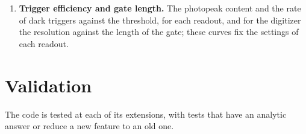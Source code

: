 \documentclass[11pt]{article}
\newcommand{\us}{\textmu s\xspace}
\newcommand{\csitl}{CsI(Tl)\xspace}
\begin{document}
\begin{enumerate}
  by the Citiroc or the Radioroc2, which store a fraction of them, are in
  the ratio computed in Section~\ref{sec:citiroc} from the pulse shape and
  the shaping time: 0.33 for BGO and 0.10 for \csitl with the Citiroc, 0.97
  for BGO and 0.71 for \csitl with the Radioroc2 at 1.8~\us, at room
  temperature. The ratio follows from the shaping chains alone, with no
  free parameter.
\item {\bf Trigger efficiency and gate length.} The photopeak content and
  the rate of dark triggers against the threshold, for each readout, and
  for the digitizer the resolution against the length of the gate; these
  curves fix the settings of each readout.
\end{enumerate}

\section{Validation}
\label{sec:validation}

The code is tested at each of its extensions, with tests that have an
analytic answer or reduce a new feature to an old one.
\end{document}
